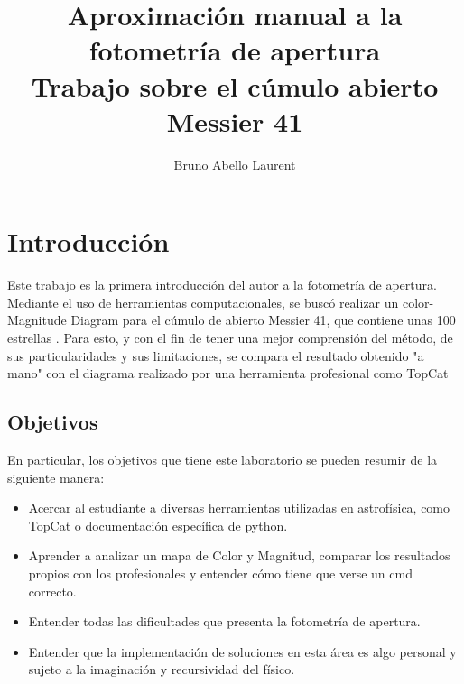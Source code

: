 \documentclass[10pt,twocolumn]{article}
\title{\textbf{Aproximación manual a la fotometría de apertura}\\Trabajo sobre el cúmulo abierto Messier 41}
\author[1]{Bruno Abello Laurent}
\affil[1]{Universidad de Los Andes, Departamento de Física, Colombia}
\date{}
\begin{document}


\section{Introducción}

Este trabajo es la primera introducción del autor a la fotometría de apertura. Mediante el uso de herramientas computacionales,
se buscó realizar un color-Magnitude Diagram para el cúmulo de abierto Messier 41, que contiene unas 100 estrellas \nocite{wikipedia_messier41}. 
Para esto, y con el fin de tener una mejor comprensión del método, de sus particularidades y sus limitaciones, se compara el resultado obtenido "a mano" con el diagrama realizado por una herramienta profesional como TopCat

\subsection{Objetivos}

En particular, los objetivos que tiene este laboratorio se pueden resumir de la siguiente manera:
\begin{itemize}
    \item Acercar al estudiante a diversas herramientas utilizadas en astrofísica, como TopCat o documentación específica de python.
    \item Aprender a analizar un mapa de Color y Magnitud, comparar los resultados propios con los profesionales y entender cómo tiene que verse un cmd correcto.
    \item Entender todas las dificultades que presenta la fotometría de apertura.
    \item Entender que la implementación de soluciones en esta área es algo personal y sujeto a la imaginación y recursividad del físico. 
\end{itemize}
\end{document}
